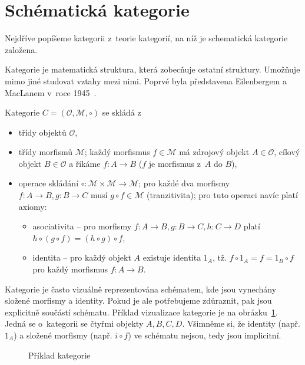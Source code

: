 \section{Schématická kategorie}

Nejdříve popíšeme kategorii z~teorie kategorií, na níž je schematická kategorie založena.

Kategorie je matematická struktura, která zobecňuje ostatní struktury.
Umožňuje mimo jiné studovat vztahy mezi nimi.
Poprvé byla představena Eilenbergem a MacLanem v~roce 1945~\cite{eilenberg_1945}.

Kategorie $C=(\mathcal O, \mathcal M, \circ)$ se skládá
z~\begin{itemize}
  \item třídy objektů $\mathcal O$,
  \item třídy morfismů $\mathcal M$; každý morfismus $f \in \mathcal M$ má zdrojový objekt $A\in\mathcal O$, cílový objekt $B\in\mathcal O$ a říkáme $f: A\to B$ ($f$ je morfismus z~$A$ do $B$),
  \item operace skládání $\circ\colon \mathcal M\times\mathcal M \to \mathcal M$; pro každé dva morfismy $f\colon A\to B, g\colon B\to C$ musí $g\circ f\in \mathcal M$ (tranzitivita); pro tuto operaci navíc platí axiomy:
        \begin{itemize}
          \item asociativita -- pro morfismy $f\colon A\to B, g\colon B\to C, h\colon C\to D$ platí $h\circ (g \circ f) = (h\circ g)\circ f$,
          \item identita -- pro každý objekt $A$ existuje identita $1_A$, tž. $f\circ 1_A = f = 1_B\circ f$ pro každý morfismus $f: A\to B$.
        \end{itemize}
\end{itemize}

Kategorie je často vizuálně reprezentována schématem, kde jsou vynechány složené morfismy a identity.
Pokud je ale potřebujeme zdůraznit, pak jsou explicitně součástí schématu.
Příklad vizualizace kategorie je na obrázku~\ref{fig:category-example}.
Jedná se o~kategorii se čtyřmi objekty $A, B, C, D$.
Všimněme si, že identity (např. $1_A$) a složené morfismy (např. $i\circ f$) ve schématu nejsou, tedy jsou implicitní.

\begin{figure}[!htb]
  \begin{center}
  \end{center}
  \caption{Příklad kategorie}
  \label{fig:category-example}
\end{figure}

